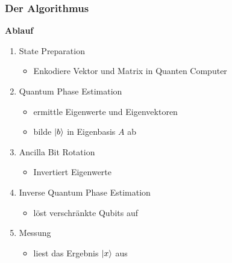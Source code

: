     \begin{frame}
    \frametitle{Der Algorithmus}

        \textbf{Ablauf}
        \begin{enumerate}
            \item State Preparation
            \begin{itemize}
                \item Enkodiere Vektor und Matrix in Quanten Computer
            \end{itemize}
            \item Quantum Phase Estimation
            \begin{itemize}
                \item ermittle Eigenwerte und Eigenvektoren 
                \item bilde $\ket{b}$ in Eigenbasis $A$ ab
            \end{itemize}
            \item Ancilla Bit Rotation 
            \begin{itemize}
                \item  Invertiert Eigenwerte
            \end{itemize}
            \item Inverse Quantum Phase Estimation
             \begin{itemize}
                \item löst verschränkte Qubits auf
            \end{itemize}
            
            \item Messung
             \begin{itemize}
                \item liest das Ergebnis $\ket{x}$ aus
            \end{itemize}
 
        \end{enumerate}

    \end{frame}

